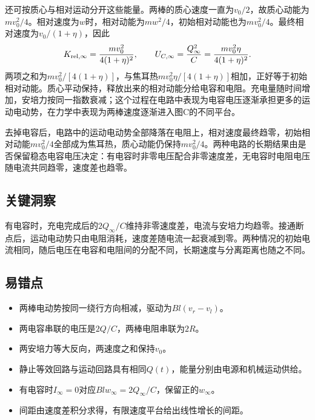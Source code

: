\documentclass[UTF8,fontset=fandol,a4paper,11pt]{ctexart}
\begin{document}
还可按质心与相对运动分开这些能量。两棒的质心速度一直为$v_0/2$，故质心动能为$mv_0^2/4$。相对速度为$w$时，相对动能为$mw^2/4$，初始相对动能也为$mv_0^2/4$。最终相对速度为$v_0/(1+\eta)$，因此
\[
K_{\rm rel,\infty}=\frac{mv_0^2}{4(1+\eta)^2},\qquad
U_{C,\infty}=\frac{Q_\infty^2}{C}
=\frac{mv_0^2\eta}{4(1+\eta)^2}.
\]
两项之和为$mv_0^2/[4(1+\eta)]$，与焦耳热$mv_0^2\eta/[4(1+\eta)]$相加，正好等于初始相对动能。质心平动保持，释放出来的相对动能分给电容和电阻。充电量随时间增加，安培力按同一指数衰减；这个过程在电路中表现为电容电压逐渐承担更多的运动电动势，在力学中表现为两棒速度逐渐进入图C的不同平台。

去掉电容后，电路中的运动电动势全部降落在电阻上，相对速度最终趋零，初始相对动能$mv_0^2/4$全部成为焦耳热，质心动能仍保持$mv_0^2/4$。两种电路的长期结果由是否保留稳态电容电压决定：有电容时非零电压配合非零速度差，无电容时电阻电压随电流共同趋零，速度差也趋零。





\subsection*{关键洞察}

有电容时，充电完成后的$2Q_\infty/C$维持非零速度差，电流与安培力均趋零。接通断点后，运动电动势只由电阻消耗，速度差随电流一起衰减到零。两种情况的初始电流相同，随后电压在电容和电阻间的分配不同，长期速度与分离距离也随之不同。



\subsection*{易错点}

\begin{itemize}
\item 两棒电动势按同一绕行方向相减，驱动为$Bl(v_r-v_l)$。
\item 两电容串联的电压是$2Q/C$，两棒电阻串联为$2R$。
\item 两安培力等大反向，两速度之和保持$v_0$。
\item 静止等效回路与运动回路具有相同$Q(t)$，能量分别由电源和机械运动供给。
\item 有电容时$I_\infty=0$对应$Blw_\infty=2Q_\infty/C$，保留正的$w_\infty$。
\item 间距由速度差积分求得，有限速度平台给出线性增长的间距。
\end{itemize}
\end{document}
